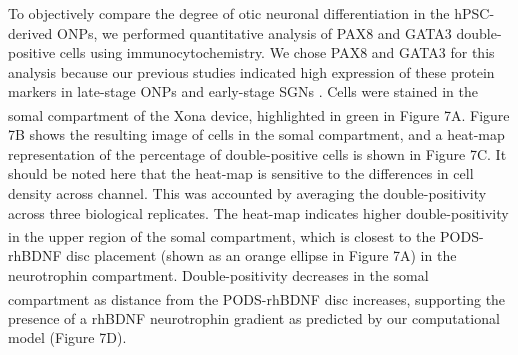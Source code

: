 \documentclass[review]{elsarticle}
\begin{document}
To objectively compare the degree of otic neuronal differentiation in the hPSC-derived ONPs, we performed quantitative analysis of PAX8 and GATA3 double-positive cells using immunocytochemistry. We chose PAX8 and GATA3 for this analysis because our previous studies indicated high expression of these protein markers in late-stage ONPs and early-stage SGNs \cite{Heuer2021,Chang2020, Matsuoka2017}. Cells were stained in the somal compartment of the Xona\textsuperscript{\texttrademark} device, highlighted in green in Figure 7A. Figure 7B shows the resulting image of cells in the somal compartment, and a heat-map representation of the percentage of double-positive cells is shown in Figure 7C.
It should be noted here that the heat-map is sensitive to the differences in cell density across channel. This was accounted by averaging the double-positivity across three biological replicates. The heat-map indicates higher double-positivity in the upper region of the somal compartment, which is closest to the PODS\textsuperscript{\textregistered}-rhBDNF disc placement (shown as an orange ellipse in Figure 7A) in the neurotrophin compartment. Double-positivity decreases in the somal compartment as distance from the PODS\textsuperscript{\textregistered}-rhBDNF disc increases, supporting the presence of a rhBDNF neurotrophin gradient as predicted by our computational model (Figure 7D).
\end{document}
